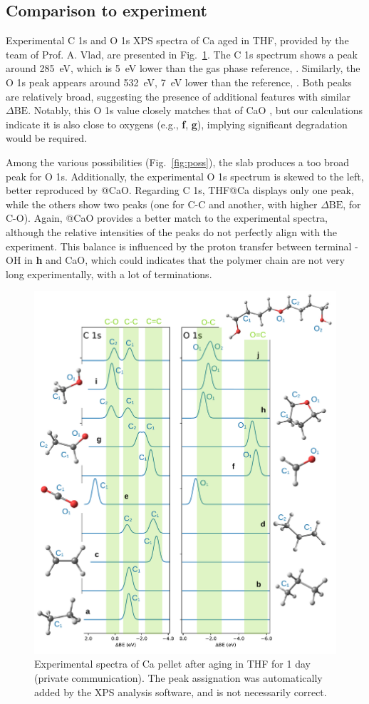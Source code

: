 \documentclass[12pt,a4paper]{article}
\def\dbe{\ensuremath{\Delta\text{BE}}}
\begin{document}
\subsection{Comparison to experiment}

Experimental C 1s and O 1s XPS spectra of Ca aged in THF, provided by the team of Prof. A. Vlad, are presented in Fig.~\ref{fig:exp}. The C 1s spectrum shows a peak around \SI{285}{\electronvolt}, which is \SI{5}{\electronvolt} lower than the gas phase reference, . Similarly, the O 1s peak appears around \SI{532}{\electronvolt}, \SI{7}{\electronvolt} lower than the reference, . Both peaks are relatively broad, suggesting the presence of additional features with similar \dbe{}. Notably, this O 1s value closely matches that of CaO \cite{cristHandbookMonochromaticXPS1999}, but our calculations indicate it is also close to  oxygens (e.g., \textbf{f}, \textbf{g}), implying significant degradation would be required.

Among the various possibilities (Fig.~\ref{fig:poss}), the  slab produces a too broad peak for O 1s. Additionally, the experimental O 1s spectrum is skewed to the left, better reproduced by @CaO. Regarding C 1s, THF@Ca displays only one peak, while the others show two peaks (one for C-C and another, with higher \dbe{}, for C-O). Again, @CaO provides a better match to the experimental spectra, although the relative intensities of the peaks do not perfectly align with the experiment. This balance is influenced by the proton transfer between terminal -OH in \textbf{h} and CaO, which could indicates that the polymer chain are not very long experimentally, with a lot of terminations.


\begin{figure}[!h]
	\centering
	\includegraphics[width=.6\linewidth]{Figure11}
	\caption{Experimental spectra of Ca pellet after aging in THF for 1 day (private communication). The peak assignation was automatically added by the XPS analysis software, and is not necessarily correct.}
	\label{fig:exp}
\end{figure}
\end{document}
